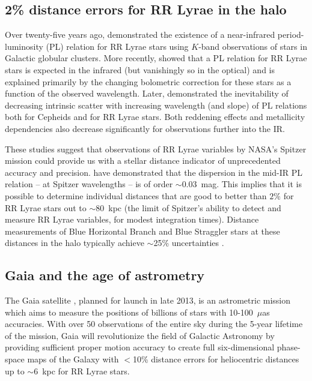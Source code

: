 \documentclass[preprint]{aastex}
\begin{document}
\subsection{2\% distance errors for RR Lyrae in the halo}
\label{sec:spitzer}
Over twenty-five years ago, \citet{longmore1986} demonstrated the
existence of a near-infrared period-luminosity (PL) relation for RR
Lyrae stars using $K$-band observations of stars in Galactic
globular clusters. More recently, \citet{catelan2004} showed that a PL
relation for RR Lyrae stars is expected in the infrared (but
vanishingly so in the optical) and is explained primarily by the
changing bolometric correction for these stars as a function of the
observed wavelength. Later, \citet{madore2012} demonstrated the
inevitability of decreasing intrinsic scatter with increasing
wavelength (and slope) of PL relations both for Cepheids and for RR
Lyrae stars. Both reddening effects and metallicity dependencies also
decrease significantly for observations further into the IR.

These studies suggest that observations of RR Lyrae variables by
NASA's Spitzer mission could provide us with a stellar distance
indicator of unprecedented accuracy and precision. \citet{madore2012}
have demonstrated \citep[using five stars with trigonometric parallaxes
  measured by Hubble;][]{benedict2011} that the dispersion in the
mid-IR PL relation -- at Spitzer wavelengths -- is of order
$\sim$0.03~mag. This implies that it is possible to determine
individual distances that are good to better than $2\%$ for RR
Lyrae stars out to $\sim$80~kpc (the limit of Spitzer's ability to
detect and measure RR Lyrae variables, for modest integration
times). Distance measurements of Blue Horizontal Branch and Blue Straggler stars at these distances in the halo typically achieve $\sim$25\% uncertainties \citep[e.g.,][]{deason2012}. 

\subsection{Gaia and the age of astrometry}
\label{sec:gaia}
The Gaia satellite \citep{gaia2001}, planned for launch in late
2013, is an astrometric mission which aims to measure the positions of billions of stars with
10-100~$\mu$as accuracies. With over 50 observations of the entire sky
during the 5-year lifetime of the mission, Gaia will
revolutionize the field of Galactic Astronomy by providing sufficient
proper motion accuracy to create full six-dimensional phase-space
maps of the Galaxy with $<$10\% distance errors for heliocentric distances up to $\sim$6~kpc for RR Lyrae stars.
\end{document}
